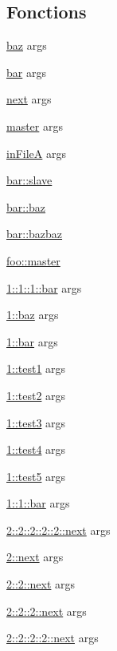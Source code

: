 \subsection*{Fonctions}
\begin{DoxyCompactItemize}
\item 
\hyperlink{057__caller__graphs_8tcl_a85c692c418fec91930cfc7b3e82857d7}{baz} args
\item 
\hyperlink{057__caller__graphs_8tcl_ae4e1c2bb3adfdfbb71f52de84a8285b0}{bar} args
\item 
\hyperlink{057__caller__graphs_8tcl_a3f808a00e1b937978455d707851ab33a}{next} args
\item 
\hyperlink{057__caller__graphs_8tcl_a12acb916374f925e7b7ba302a1ca4efb}{master} args
\item 
\hyperlink{057__caller__graphs_8tcl_a7482c00c17357cf4846b0c1bd715979c}{in\+File\+A} args
\item 
\hyperlink{namespacebar_aa1678a9adb588c0b91b118de7cc38ddb}{bar\+::slave}
\item 
\hyperlink{namespacebar_a3426cd3a2eebcffa0dc333bcf5e2fe5e}{bar\+::baz}
\item 
\hyperlink{namespacebar_a88879545dee287d377e638b87cdf6dd7}{bar\+::bazbaz}
\item 
\hyperlink{namespacefoo_a265acdcaea6da32c3bbd9afb5d0e32a4}{foo\+::master}
\item 
\hyperlink{namespace1_1_11_1_11_aa604df053f7ebe36205d1a5675459b96}{1\+::1\+::1\+::bar} args
\item 
\hyperlink{namespace1_a5024a7bc323958c7230615f2fcaeaef8}{1\+::baz} args
\item 
\hyperlink{namespace1_ad58c8f16ad5f12178c71ca988865bb58}{1\+::bar} args
\item 
\hyperlink{namespace1_a4a8285288ee1994ac886e2039777339e}{1\+::test1} args
\item 
\hyperlink{namespace1_ae1e88bb7ddd332348d7e29ac4a211b00}{1\+::test2} args
\item 
\hyperlink{namespace1_a9722420639306872cea2593b83028a45}{1\+::test3} args
\item 
\hyperlink{namespace1_addc9b30656419de5e2651e27a013db29}{1\+::test4} args
\item 
\hyperlink{namespace1_a11615154d3c207ed4106dd0bcb0639e8}{1\+::test5} args
\item 
\hyperlink{namespace1_1_11_acebecc4cb718010d00c3c150158b75ab}{1\+::1\+::bar} args
\item 
\hyperlink{namespace2_1_12_1_12_1_12_1_12_ac07f64c62783fd8b44317389b4a711f8}{2\+::2\+::2\+::2\+::2\+::next} args
\item 
\hyperlink{namespace2_a2839d9dea7f0d08f48958c3fc0cd00d3}{2\+::next} args
\item 
\hyperlink{namespace2_1_12_aceefa876cf364f44da1f523d3f7b0649}{2\+::2\+::next} args
\item 
\hyperlink{namespace2_1_12_1_12_a85524e2015e377d433cd8384335c11d6}{2\+::2\+::2\+::next} args
\item 
\hyperlink{namespace2_1_12_1_12_1_12_a3ea6e2ce66f4a9c30009852e4c7da2fe}{2\+::2\+::2\+::2\+::next} args
\end{DoxyCompactItemize}


